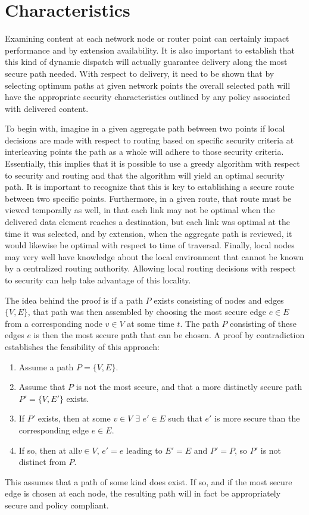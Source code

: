 \section{Characteristics}
\label{section:characteristics}
Examining content at each network node or router point can certainly impact performance and by extension availability.  It is also important to establish that this kind of dynamic dispatch will actually guarantee delivery along the most secure path needed.  With respect to delivery, it need to be shown that by selecting optimum paths at given network points the overall selected path will have the appropriate security characteristics outlined by any policy associated with delivered content.

To begin with, imagine in a given aggregate path between two points if local decisions are made with respect to routing based on specific security criteria at interleaving points the path as a whole will adhere to those security criteria.  Essentially, this implies that it is possible to use a greedy algorithm with respect to security and routing and that the algorithm will yield an optimal security path.  It is important to recognize that this is key to establishing a secure route between two specific points.  Furthermore, in a given route, that route must be viewed temporally as well, in that each link may not be optimal when the delivered data element reaches a destination, but each link was optimal at the time it was selected, and by extension, when the aggregate path is reviewed, it would likewise be optimal with respect to time of traversal.  Finally, local nodes may very well have knowledge about the local environment that cannot be known by a centralized routing authority.  Allowing local routing decisions with respect to security can help take advantage of this locality.

The idea behind the proof is if a path $P$ exists consisting of nodes and edges $\lbrace V, E \rbrace$, that path was then assembled by choosing the most secure edge $e \in E$ from a corresponding node $v \in V$ at some time $t$.  The path $P$ consisting of these edges $e$ is then the most secure path that can be chosen.  A proof by contradiction establishes the feasibility of this approach:

\begin{enumerate}
\item Assume a path $P = \lbrace V, E \rbrace$.
\item Assume that $P$ is not the most secure, and that a more distinctly secure path $P' = \lbrace V, E' \rbrace$ exists.
\item If $P'$ exists, then at some $v \in V$ $\exists$ $e' \in E$ such that $e'$ is more secure than the corresponding edge $e \in E$.
\item If so, then at all$v \in V$, $e' = e$ leading to $E' = E$ and $P' = P$, so $P'$ is not distinct from $P$. 
\end{enumerate}

This assumes that a path of some kind does exist.  If so, and if the most secure edge is chosen at each node, the resulting path will in fact be appropriately secure and policy compliant.